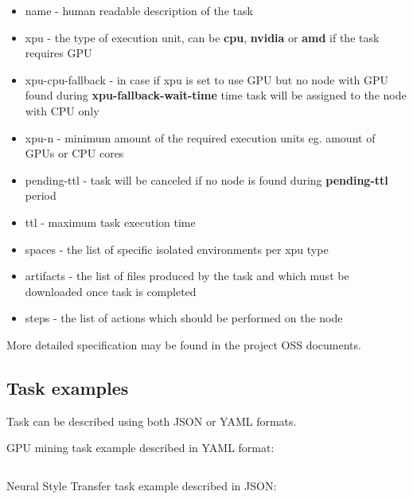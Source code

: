 \begin{itemize}
    \item name - human readable description of the task
    \item xpu - the type of execution unit, can be \textbf{cpu}, \textbf{nvidia} or \textbf{amd} if the task requires GPU
    \item xpu-cpu-fallback - in case if xpu is set to use GPU but no node with GPU found during \textbf{xpu-fallback-wait-time} time task will be assigned to the node with CPU only
    \item xpu-n - minimum amount of the required execution units eg. amount of GPUs or CPU cores
    \item pending-ttl - task will be canceled if no node is found during \textbf{pending-ttl} period
    \item ttl - maximum task execution time
    \item spaces - the list of specific isolated environments per xpu type
    \item artifacts - the list of files produced by the task and which must be downloaded once task is completed
    \item steps - the list of actions which should be performed on the node
\end{itemize}

More detailed specification may be found in the project OSS\cite{oss} documents.

\subsection{Task examples}

Task can be described using both JSON or YAML formats.

GPU mining task example described in YAML format:

\inputminted{yaml}{claymore-cuda-mining-task.yaml}

\newpage
Neural Style Transfer task example described in JSON:

\inputminted{json}{neural-style-task.json}
